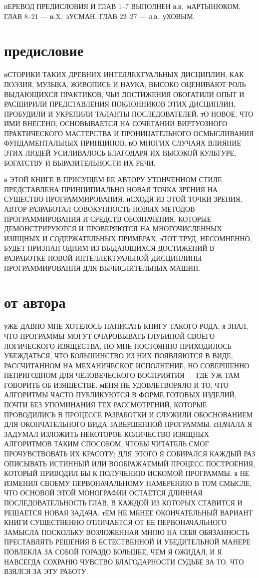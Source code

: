 пЕРЕВОД ПРЕДИСЛОВИЯ И ГЛАВ 1--7 ВЫПОЛНЕН в.в.~мАРТЫНЮКОМ, 
ГЛАВ 8--21 --- и.X.~зУСМАН,  ГЛАВ 22--27 --- л.в.~уХОВЫМ.

\eject
\vfill

\chapter{предисловие}
\medskip
иСТОРИКИ ТАКИХ ДРЕВНИХ ИНТЕЛЛЕКТУАЛЬНЫХ ДИСЦИПЛИН, КАК ПОЭЗИЯ, МУЗЫКА, ЖИВОПИСЬ 
И НАУКА, ВЫСОКО ОЦЕНИВАЮТ РОЛЬ ВЫДАЮЩИХСЯ ПРАКТИКОВ, ЧЬИ ДОСТИЖЕНИЯ ОБОГАТИЛИ 
ОПЫТ И РАСШИРИЛИ ПРЕДСТАВЛЕНИЯ ПОКЛОННИКОВ ЭТИХ ДИСЦИПЛИН, ПРОБУДИЛИ И УКРЕПИЛИ 
ТАЛАНТЫ ПОСЛЕДОВАТЕЛЕЙ. тО НОВОЕ, ЧТО ИМИ ВНЕСЕНО, ОСНОВЫВАЕТСЯ НА СОЧЕТАНИИ
ВИРТУОЗНОГО ПРАКТИЧЕСКОГО МАСТЕРСТВА И ПРОНИЦАТЕЛЬНОГО ОСМЫСЛИВАНИЯ 
ФУНДАМЕНТАЛЬНЫХ ПРИНЦИПОВ. вО МНОГИХ СЛУЧАЯХ ВЛИЯНИЕ ЭТИХ ЛЮДЕЙ УСИЛИВАЛОСЬ 
БЛАГОДАРЯ ИХ ВЫСОКОЙ КУЛЬТУРЕ, БОГАТСТВУ И ВЫРАЗИТЕЛЬНОСТИ ИХ РЕЧИ.
     
в ЭТОЙ КНИГЕ В ПРИСУЩЕМ ЕЕ АВТОРУ УТОНЧЕННОМ СТИЛЕ ПРЕДСТАВЛЕНА ПРИНЦИПИАЛЬНО 
НОВАЯ ТОЧКА ЗРЕНИЯ НА СУЩЕСТВО ПРОГРАММИРОВАНИЯ. иСХОДЯ ИЗ ЭТОЙ ТОЧКИ
ЗРЕНИЯ, АВТОР РАЗРАБОТАЛ СОВОКУПНОСТЬ НОВЫХ МЕТОДОВ ПРОГРАММИРОВАНИЯ И 
СРЕДСТВ ОБОЗНАЧЕНИЯ, КОТОРЫЕ ДЕМОНСТРИРУЮТСЯ И ПРОВЕРЯЮТСЯ НА МНОГОЧИСЛЕННЫХ
ИЗЯЩНЫХ И СОДЕРЖАТЕЛЬНЫХ ПРИМЕРАХ. эТОТ ТРУД, НЕСОМНЕННО, БУДЕТ ПРИЗНАН ОДНИМ 
ИЗ ВЫДАЮЩИХСЯ ДОСТИЖЕНИЙ В РАЗРАБОТКЕ НОВОЙ ИНТЕЛЛЕКТУАЛЬНОЙ 
ДИСЦИПЛИНЫ --- ПРОГРАММИРОВАННЯ ДЛЯ ВЫЧИСЛИТЕЛЬНЫХ МАШИН.

\vfill
\eject
     
\chapter{от автора}
уЖЕ ДАВНО МНЕ ХОТЕЛОСЬ НАПИСАТЬ КНИГУ ТАКОГО РОДА. я ЗНАЛ, ЧТО ПРОГРАММЫ 
МОГУТ ОЧАРОВЫВАТЬ ГЛУБИНОЙ СВОЕГО  ЛОГИЧЕСКОГО ИЗЯЩЕСТВА, НО МНЕ
ПОСТОЯННО ПРИХОДИЛОСЬ  УБЕЖДАТЬСЯ, ЧТО БОЛЬШИНСТВО ИЗ НИХ ПОЯВЛЯЮТСЯ В 
ВИДЕ, РАССЧИТАННОМ  НА МЕХАНИЧЕСКОЕ ИСПОЛНЕНИЕ, НО СОВЕРШЕННО НЕПРИГОДНОМ
ДЛЯ ЧЕЛОВЕЧЕСКОГО ВОСПРИЯТИЯ --- ГДЕ УЖ ТАМ ГОВОРИТЬ ОБ ИЗЯЩЕСТВЕ.  
мЕНЯ НЕ УДОВЛЕТВОРЯЛО И ТО, ЧТО АЛГОРИТМЫ ЧАСТО ПУБЛИКУЮТСЯ В ФОРМЕ ГОТОВЫХ
ИЗДЕЛИЙ, ПОЧТИ БЕЗ УПОМИНАНИЯ ТЕХ РАССМОТРЕНИЙ, КОТОРЫЕ ПРОВОДИЛИСЬ В ПРОЦЕССЕ 
РАЗРАБОТКИ И СЛУЖИЛИ ОБОСНОВАНИЕМ ДЛЯ ОКОНЧАТЕЛЬНОГО ВИДА ЗАВЕРШЕННОЙ
ПРОГРАММЫ. сНАЧАЛА Я ЗАДУМАЛ ИЗЛОЖИТЬ НЕКОТОРОЕ КОЛИЧЕСТВО ИЗЯЩНЫХ АЛГОРИТМОВ 
ТАКИМ СПОСОБОМ, ЧТОБЫ ЧИТАТЕЛЬ СМОГ ПРОЧУВСТВОВАТЬ ИХ КРАСОТУ; ДЛЯ ЭТОГО
Я СОБИРАЛСЯ КАЖДЫЙ РАЗ ОПИСЫВАТЬ ИСТИННЫЙ ИЛИ ВООБРАЖАЕМЫЙ ПРОЦЕСС ПОСТРОЕНИЯ, 
КОТОРЫЙ ПРИВОДИЛ БЫ К ПОЛУЧЕНИЮ ИСКОМОЙ ПРОГРАММЫ. я НЕ ИЗМЕНИЛ СВОЕМУ 
ПЕРВОНАЧАЛЬНОМУ НАМЕРЕНИЮ В ТОМ СМЫСЛЕ, ЧТО ОСНОВОЙ ЭТОЙ МОНОГРАФИИ ОСТАЕТСЯ 
ДЛИННАЯ ПОСЛЕДОВАТЕЛЬНОСТЬ ГЛАВ, В КАЖДОЙ ИЗ КОТОРЫХ СТАВИТСЯ И РЕШАЕТСЯ НОВАЯ 
ЗАДАЧА. тЕМ НЕ МЕНЕЕ ОКОНЧАТЕЛЬНЫЙ ВАРИАНТ КНИГИ СУЩЕСТВЕННО ОТЛИЧАЕТСЯ
ОТ ЕЕ ПЕРВОНАЧАЛЬНОГО ЗАМЫСЛА ПОСКОЛЬКУ ВОЗЛОЖЕННАЯ МНОЮ НА СЕБЯ ОБЯЗАННОСТЬ 
ПРЕСТАВЛЯТЬ РЕШЕНИЯ В ЕСТЕСТВЕННОЙ И УБЕДИТЕЛЬНОЙ МАНЕРЕ ПОВЛЕКЛА ЗА СОБОЙ 
ГОРАЗДО БОЛЬШЕЕ, ЧЕМ Я ОЖИДАЛ, И Я НАВСЕГДА СОХРАНЮ ЧУВСТВО БЛАГОДАРНОСТИ 
СУДЬБЕ ЗА ТО, ЧТО ВЗЯЛСЯ ЗА ЭТУ РАБОТУ.
     
